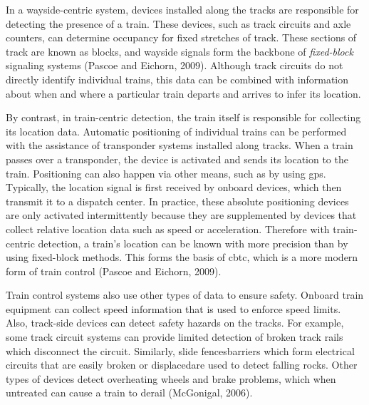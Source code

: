 \documentclass[11pt, titlepage]{article}
\begin{document}
In a wayside-centric system, devices installed along the tracks are responsible
for detecting the presence of a train. These devices, such as track circuits and
axle counters, can determine occupancy for fixed stretches of track. These
sections of track are known as blocks, and wayside signals form the backbone of
\textit{fixed-block} signaling systems (Pascoe and Eichorn, 2009). Although track
circuits do not directly identify individual trains, this data can be combined
with information about when and where a particular train departs and arrives to
infer its location.

By contrast, in train-centric detection, the train itself is responsible for
collecting its location data. Automatic positioning of individual trains can be
performed with the assistance of transponder systems installed along tracks. When
a train passes over a transponder, the device is activated and sends its location
to the train. Positioning can also happen via other means, such as by using
\gls{gps}. Typically, the location signal is first received by onboard devices,
which then transmit it to a dispatch center. In practice, these absolute
positioning devices are only activated intermittently because they are
supplemented by devices that collect relative location data such as speed or
acceleration. Therefore with train-centric detection, a train’s location can be
known with more precision than by using fixed-block methods. This forms the basis
of \gls{cbtc}, which is a more modern form of train control (Pascoe and Eichorn,
2009).

Train control systems also use other types of data to ensure safety. Onboard train
equipment can collect speed information that is used to enforce speed limits.
Also, track-side devices can detect safety hazards on the tracks. For example,
some track circuit systems can provide limited detection of broken track rails
which disconnect the circuit. Similarly, slide fences\textemdash barriers which
form electrical circuits that are easily broken or displaced\textemdash are used
to detect falling rocks. Other types of devices detect overheating wheels and
brake problems, which when untreated can cause a train to derail (McGonigal,
2006).
\end{document}
